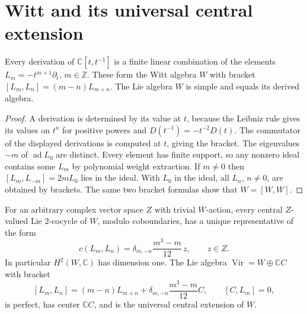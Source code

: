 \section{Witt and its universal central extension}

\begin{proposition}
\label{res:KM10}
Every derivation of \(\mathbb C[t,t^{-1}]\) is a finite linear
combination of the elements \(L_m=-t^{m+1}\partial_t\),
\(m\in\mathbb Z\). These form the Witt algebra \(W\) with bracket
\([L_m,L_n]=(m-n)L_{m+n}\). The Lie algebra \(W\) is simple
and equals its derived algebra.
\end{proposition}

\begin{proof}
A derivation is determined by its value at \(t\), because the
Leibniz rule gives its values on \(t^n\) for positive powers
and \(D(t^{-1})=-t^{-2}D(t)\). The commutator of the
displayed derivations is computed at \(t\), giving the bracket.
The eigenvalues \(-m\) of \(\operatorname{ad}L_0\) are distinct.
Every element has finite support, so any nonzero ideal contains
some \(L_m\) by polynomial weight extraction. If \(m\ne0\)
then \([L_m,L_{-m}]=2mL_0\) lies in the ideal. With \(L_0\)
in the ideal, all \(L_n\), \(n\ne0\), are obtained by brackets.
The same two bracket formulas show that \(W=[W,W]\).
\end{proof}

\begin{theorem}
\label{res:KM11}
For an arbitrary complex vector space \(Z\) with trivial \(W\)-action,
every central \(Z\)-valued Lie \(2\)-cocycle of \(W\), modulo
coboundaries, has a unique representative of the form
\[
 c(L_m,L_n)=\delta_{m,-n}\frac{m^3-m}{12}\,z,\qquad z\in Z.
\]
In particular \(H^2(W,\mathbb C)\) has dimension one.
The Lie algebra \(\operatorname{Vir}=W\oplus\mathbb C C\)
with bracket
\[
 [L_m,L_n]=(m-n)L_{m+n}
             +\delta_{m,-n}\frac{m^3-m}{12}C,\qquad [C,L_m]=0 ,
\]
is perfect, has center \(\mathbb C C\), and is the universal
central extension of \(W\).
\end{theorem}

